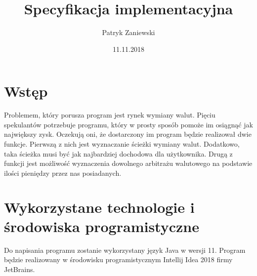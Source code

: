 ﻿\documentclass[12pt]{article}
\title{Specyfikacja implementacyjna}
\author{Patryk Zaniewski}
\date{11.11.2018}
\begin{document}
\maketitle

\tableofcontents
\newpage

\section{Wstęp}
Problemem, który porusza program jest rynek wymiany walut. Pięciu spekulantów potrzebuje programu, który w prosty sposób pomoże im osiągnąć jak największy zysk. Oczekują oni, że dostarczony im program będzie realizował dwie funkcje. Pierwszą z nich jest wyznaczanie ścieżki wymiany walut. Dodatkowo, taka ścieżka musi być jak najbardziej dochodowa dla użytkownika. Drugą z funkcji jest możliwość wyznaczenia dowolnego arbitrażu walutowego na podstawie ilości pieniędzy przez nas posiadanych.

\section{Wykorzystane technologie i środowiska programistyczne}
Do napisania programu zostanie wykorzystany język Java w wersji 11. Program będzie realizowany w środowisku programistycznym Intellij Idea 2018 firmy JetBrains.
\end{document}
